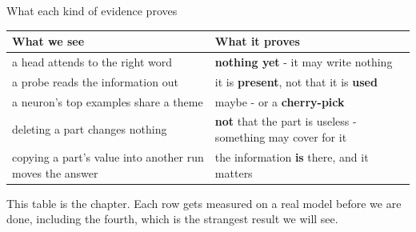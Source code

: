 \documentclass[aspectratio=169]{beamer}
\newcommand{\takebox}[1]{%
  \begin{tcolorbox}[colback=paramgreen!8, colframe=paramgreen, boxrule=0.6pt, arc=2pt]
  #1
  \end{tcolorbox}}
\begin{document}
\begin{frame}{What each kind of evidence proves}
  \vspace{0.5em}
  \begin{center}
  \small
  \begin{tabular}{@{}p{}p{}@{}}
    \toprule
    \textbf{What we see} & \textbf{What it proves}\\
    \midrule
    a head attends to the right word & \textbf{nothing yet} - it may write nothing\\[0.3em]
    a probe reads the information out & it is \textbf{present}, not that it is \textbf{used}\\[0.3em]
    a neuron's top examples share a theme & maybe - or a \textbf{cherry-pick}\\[0.3em]
    deleting a part changes nothing & \textbf{not} that the part is useless - something may cover
      for it\\[0.3em]
    copying a part's value into another run moves the answer & the information \textbf{is} there,
      and it matters\\
    \bottomrule
  \end{tabular}
  \end{center}

  \vspace{0.7em}
  \takebox{This table is the chapter. Each row gets measured on a real model before we are done,
  including the fourth, which is the strangest result we will see.}
\end{frame}
\end{document}
